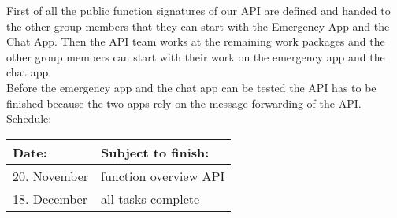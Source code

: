
First of all the public function signatures of our API are defined and handed to the other group members that they can start with the Emergency App and the Chat App. Then the API team works at the remaining work packages and the other group members can start with their work on the emergency app and the chat app.\\[3mm]
Before the emergency app and the chat app can be tested the API has to be finished because the two apps rely on the message forwarding of the API.\\[3mm]
Schedule: \\
\begin{center}
\begin{tabular}{|l|l|}
		\hline
		Date: & Subject to finish: \\ \hline
		20. November & function overview API \\
		18. December & all tasks complete \\
		\hline
	\end{tabular}
\end{center}